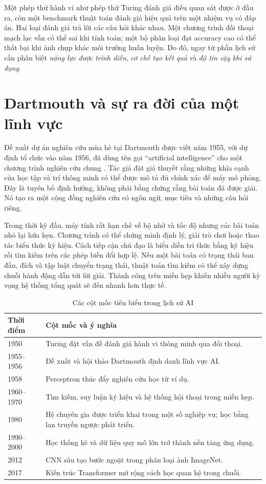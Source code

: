 \documentclass[12pt,a4paper]{report}
\begin{document}
Một phép thử hành vi như phép thử Turing đánh giá điều quan sát được ở đầu ra, còn một benchmark thuật toán đánh giá hiệu quả trên một nhiệm vụ có đáp án. Hai loại đánh giá trả lời các câu hỏi khác nhau. Một chương trình đối thoại mạch lạc vẫn có thể sai khi tính toán; một bộ phân loại đạt accuracy cao có thể thất bại khi ảnh chụp khác môi trường huấn luyện. Do đó, ngay từ phần lịch sử cần phân biệt \emph{năng lực được trình diễn}, \emph{cơ chế tạo kết quả} và \emph{độ tin cậy khi sử dụng}.

\section{Dartmouth và sự ra đời của một lĩnh vực}
Đề xuất dự án nghiên cứu mùa hè tại Dartmouth được viết năm 1955, với dự định tổ chức vào năm 1956, đã dùng tên gọi ``artificial intelligence'' cho một chương trình nghiên cứu chung \cite{dartmouth1955}. Tác giả đặt giả thuyết rằng những khía cạnh của học tập và trí thông minh có thể được mô tả đủ chính xác để máy mô phỏng. Đây là tuyên bố định hướng, không phải bằng chứng rằng bài toán đã được giải. Nó tạo ra một cộng đồng nghiên cứu có ngôn ngữ, mục tiêu và những câu hỏi riêng.

Trong thời kỳ đầu, máy tính rất hạn chế về bộ nhớ và tốc độ nhưng các bài toán nhỏ lại hứa hẹn. Chương trình có thể chứng minh định lý, giải trò chơi hoặc thao tác biểu thức ký hiệu. Cách tiếp cận chủ đạo là biểu diễn tri thức bằng ký hiệu rồi tìm kiếm trên các phép biến đổi hợp lệ. Nếu một bài toán có trạng thái ban đầu, đích và tập luật chuyển trạng thái, thuật toán tìm kiếm có thể xây dựng chuỗi hành động dẫn tới lời giải. Thành công trên miền hẹp khiến nhiều người kỳ vọng hệ thống tổng quát sẽ đến nhanh hơn thực tế.

\begin{table}[htbp]\centering\caption{Các cột mốc tiêu biểu trong lịch sử AI}\label{tab:history-timeline}
\begin{tabularx}{\textwidth}{p{1.7cm}X}
\toprule\textbf{Thời điểm} & \textbf{Cột mốc và ý nghĩa}\\\midrule
1950 & Turing đặt vấn đề đánh giá hành vi thông minh qua đối thoại.\\
1955--1956 & Đề xuất và hội thảo Dartmouth định danh lĩnh vực AI.\\
1958 & Perceptron thúc đẩy nghiên cứu học từ ví dụ.\\
1960--1970 & Tìm kiếm, suy luận ký hiệu và hệ thống hội thoại trong miền hẹp.\\
1980 & Hệ chuyên gia được triển khai trong một số nghiệp vụ; học bằng lan truyền ngược phát triển.\\
1990--2000 & Học thống kê và dữ liệu quy mô lớn trở thành nền tảng ứng dụng.\\
2012 & CNN sâu tạo bước ngoặt trong phân loại ảnh ImageNet.\\
2017 & Kiến trúc Transformer mở rộng cách học quan hệ trong chuỗi.\\
\bottomrule\end{tabularx}\end{table}
\end{document}

